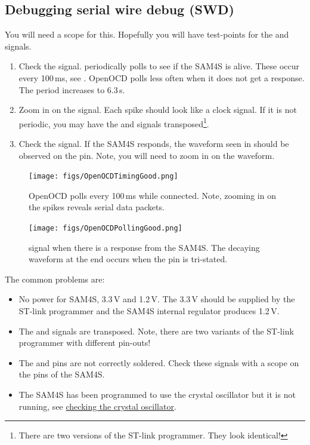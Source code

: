 \subsection{Debugging serial wire debug (SWD)}
\label{debugging-serial-wire-debug-swd}

You will need a scope for this.  Hopefully you will have test-points
for the  and  signals.

\begin{enumerate}
\item Check the  signal.   periodically
  polls to see if the SAM4S is alive.  These occur every 100\,ms, see
  .  OpenOCD polls less often when it does not
  get a response. The period increases to 6.3\,s.

\item Zoom in on the  signal.  Each spike should look like a
  clock signal.  If it is not periodic, you may have the  and
   signals transposed\footnote{There are two versions of the
    ST-link programmer.  They look identical!}.

\item Check the  signal.  If the SAM4S responds, the waveform
  seen in  should be observed on the
   pin.  Note, you will need to zoom in on the waveform.
\end{enumerate}


\begin{figure}[!h]
\centering
\texttt{[image: figs/OpenOCDTimingGood.png]}
\caption{OpenOCD polls every 100\,ms while connected.  Note, zooming
  in on the spikes reveals serial data packets.}
\label{fig:openocd-poll}
\end{figure}

\begin{figure}[!h]
\centering
\texttt{[image: figs/OpenOCDPollingGood.png]}
\caption{ signal when there is a response from the SAM4S.
  The decaying waveform at the end occurs when the pin is tri-stated.}
\label{fig:openocd-response}
\end{figure}


The common problems are:
%
\begin{itemize}
\item No power for SAM4S, 3.3\,V and 1.2\,V.  The 3.3\,V should be
  supplied by the ST-link programmer and the SAM4S internal regulator
  produces 1.2\,V.

\item The  and  signals are transposed.  Note, there
  are two variants of the ST-link programmer with different pin-outs!

\item The  and  pins are not correctly soldered.
  Check these signals with a scope on the pins of the SAM4S.

\item The SAM4S has been programmed to use the crystal oscillator but
  it is not running, see
  \protect\hyperref[checking-the-crystal-oscillator]{checking the
    crystal oscillator}.
\end{itemize}



